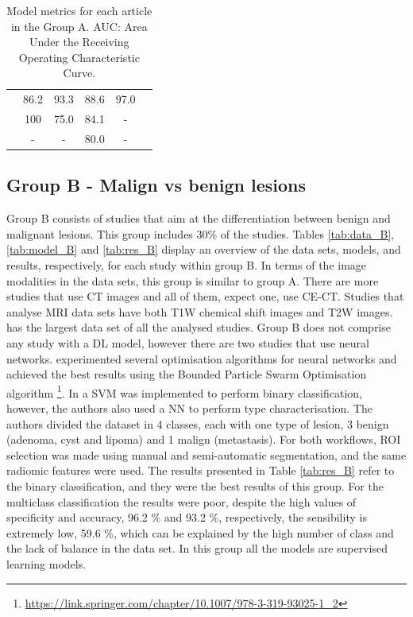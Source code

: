 \documentclass{article}
\begin{document}
\begin{table}[]
\begin{tabular}{cccccc}
        \cite{Schieda2017}                  & 86.2                                       & 93.3                                       & 88.6                                    & 97.0                               \\
        \cite{Tu2020}                       & 100                                        & 75.0                                       & 84.1                                    & -                                  \\
        \cite{Romeo2018}                    & -                                          & -                                          & 80.0                                    & -                                  \\
        \bottomrule
    \end{tabular}
    \caption{Model metrics for each article in the Group A. AUC: Area Under the Receiving Operating Characteristic Curve.}
    \label{tab:res_A}
\end{table}

\subsection{Group B - Malign vs benign lesions}

Group B consists of studies that aim at the differentiation between benign and
malignant lesions. This group includes 30\% of the studies. Tables
\ref{tab:data_B}, \ref{tab:model_B} and \ref{tab:res_B} display an overview of
the data sets, models, and results, respectively, for each study within group B.
In terms of the image modalities in the data sets, this group is similar to
group A. There are more studies that use CT images and all of them, expect one,
use CE-CT. Studies that analyse MRI data sets have both T1W chemical shift
images and T2W images. \cite{Shoemaker2018} has the largest data set of all the
analysed studies. Group B does not comprise any study with a DL model, however
there are two studies that use neural networks. \cite{Koyuncu2019} experimented
several optimisation algorithms for neural networks and achieved the best
results using the Bounded Particle Swarm Optimisation algorithm
\footnote{ \href{https://link.springer.com/chapter/10.1007/978-3-319-93025-1\_2}{https://link.springer.com/chapter/10.1007/978-3-319-93025-1\_2}}.
In \cite{Barstugan2020} a SVM was implemented to perform binary classification,
however, the authors also used a NN to perform type characterisation. The
authors divided the dataset in 4 classes, each with one type of lesion, 3 benign
(adenoma, cyst and lipoma) and 1 malign (metastasis). For both workflows, ROI
selection was made using manual and semi-automatic segmentation, and the same
radiomic features were used. The results presented in Table \ref{tab:res_B}
refer to the binary classification, and they were the best results of this
group. For the multiclass classification the results were poor, despite the high
values of specificity and accuracy, 96.2 \% and 93.2 \%, respectively, the
sensibility is extremely low, 59.6 \%, which can be explained by the high number
of class and the lack of balance in the data set. In this group all the models
are supervised learning models.
\end{document}
